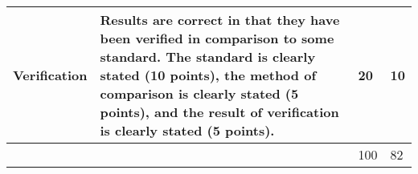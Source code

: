 \documentclass[article,12pt]{article}
\numberwithin{equation}{section}
\begin{document}
\begin{tabular}{|p{.2\linewidth}|p{.2\linewidth}|p{.2\linewidth}|p{.1\linewidth}|}
	\vspace{.2in}\textbf{Verification}        & {\tiny Results are correct in that they have been verified in comparison to some standard. The standard is clearly stated (10 points), the method of comparison is clearly stated (5 points), and the result of verification is clearly stated (5 points).}                                                                                                      & \vspace{.2in}20              &   \vspace{.2in}10   \\ \hline
	&                                                                                                                                                                                                                                                                                                                                                          & \vspace{.02in}100             &   \vspace{.02in}82     \\ \hline
\end{tabular}
\end{document}
